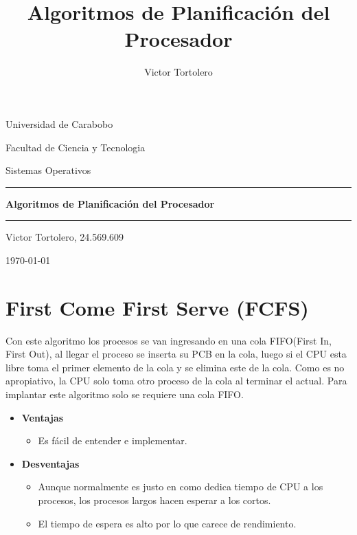 \documentclass{article}
\begin{document}
\title{Algoritmos de Planificación del Procesador}
\author{Victor Tortolero}

\centerline{Universidad de Carabobo}
\centerline{Facultad de Ciencia y Tecnologia}
\centerline{Sistemas Operativos}

\vspace{8cm}
\begin{centering}
\hrule 	\vspace{0.4cm}
	{ \Huge \bfseries Algoritmos de Planificación del Procesador \\[0.4cm] }
\hrule \vfill
\end{centering}

\vfill
\centerline{Victor Tortolero, 24.569.609}


\centerline{\today}

\newpage


\flushleft
\setlength{\parindent}{20pt}


\justify

{\centering \section{First Come First Serve (FCFS)}}

Con este algoritmo los procesos se van ingresando en una cola FIFO(First In, First Out), 
al llegar el proceso se inserta su PCB en la cola, luego si el CPU esta libre toma el primer
elemento de la cola y se elimina este de la cola. Como es no apropiativo, la CPU solo toma
otro proceso de la cola al terminar el actual. Para implantar este algoritmo solo se requiere una cola FIFO.

\begin{itemize}
	\item \textbf{Ventajas}
	\begin{itemize}
			\item Es fácil de entender e implementar.
	\end{itemize}

	\item \textbf{Desventajas}
	\begin{itemize}
		\item Aunque normalmente es justo en como dedica tiempo de CPU a los procesos,
		los procesos largos hacen esperar a los cortos.
		\item El tiempo de espera es alto por lo que carece de rendimiento.
	\end{itemize}
\end{itemize}
\end{document}
